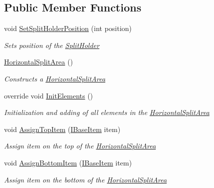 \subsection*{Public Member Functions}
\begin{DoxyCompactItemize}
\item 
void \mbox{\hyperlink{class_space_v_i_l_1_1_horizontal_split_area_a0e39ace0e53c5ec509c7b40168b025ae}{Set\+Split\+Holder\+Position}} (int position)
\begin{DoxyCompactList}\small\item\em Sets position of the \mbox{\hyperlink{class_space_v_i_l_1_1_split_holder}{Split\+Holder}} \end{DoxyCompactList}\item 
\mbox{\hyperlink{class_space_v_i_l_1_1_horizontal_split_area_ab2db170cc4803f8f92b1f54e40ccf33e}{Horizontal\+Split\+Area}} ()
\begin{DoxyCompactList}\small\item\em Constructs a \mbox{\hyperlink{class_space_v_i_l_1_1_horizontal_split_area}{Horizontal\+Split\+Area}} \end{DoxyCompactList}\item 
override void \mbox{\hyperlink{class_space_v_i_l_1_1_horizontal_split_area_ac977d45d7056f67bbd353877ff204df9}{Init\+Elements}} ()
\begin{DoxyCompactList}\small\item\em Initialization and adding of all elements in the \mbox{\hyperlink{class_space_v_i_l_1_1_horizontal_split_area}{Horizontal\+Split\+Area}} \end{DoxyCompactList}\item 
void \mbox{\hyperlink{class_space_v_i_l_1_1_horizontal_split_area_aecce1e6d987c61a20f1ae41513becefc}{Assign\+Top\+Item}} (\mbox{\hyperlink{interface_space_v_i_l_1_1_core_1_1_i_base_item}{I\+Base\+Item}} item)
\begin{DoxyCompactList}\small\item\em Assign item on the top of the \mbox{\hyperlink{class_space_v_i_l_1_1_horizontal_split_area}{Horizontal\+Split\+Area}} \end{DoxyCompactList}\item 
void \mbox{\hyperlink{class_space_v_i_l_1_1_horizontal_split_area_afb64932a4d42c31805ba585fa4c0c703}{Assign\+Bottom\+Item}} (\mbox{\hyperlink{interface_space_v_i_l_1_1_core_1_1_i_base_item}{I\+Base\+Item}} item)
\begin{DoxyCompactList}\small\item\em Assign item on the bottom of the \mbox{\hyperlink{class_space_v_i_l_1_1_horizontal_split_area}{Horizontal\+Split\+Area}} \end{DoxyCompactList}\item 

\end{DoxyCompactItemize}

